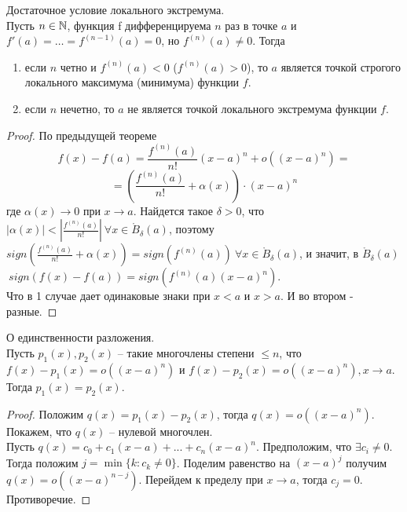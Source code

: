     \begin{corollary}{Достаточное условие локального экстремума.}\\
        Пусть $n \in \mathbb{N}$, функция f дифференцируема $n$ раз в точке $a$ и $f'(a) = \dots = f^{(n-1)}(a) = 0$,
        но $f^{(n)}(a) \neq 0$. Тогда
        \begin{enumerate}
            \item если $n$ четно и $f^{(n)}(a) < 0$ ($f^{(n)}(a) > 0$), то $a$ является точкой
            строгого локального максимума (минимума) функции $f$.
            \item если $n$ нечетно, то $a$ не является точкой локального
            экстремума функции $f$.
        \end{enumerate}
    \end{corollary}
    
    \begin{proof}
        По предыдущей теореме
        \[f(x) - f(a) = \frac{f^{(n)}(a)}{n!}(x-a)^n + o((x-a)^n) =\]
        \[= (\frac{f^{(n)}(a)}{n!} + \alpha(x))\cdot (x-a)^n\]
        где $\alpha(x) \to 0$ при $x \to a$. Найдется такое $\delta > 0$,
        что $|\alpha(x)| < |\frac{f^{(n)}(a)}{n!}| \ \forall x \in \mathring{B}_{\delta}(a)$,
        поэтому $sign(\frac{f^{(n)}(a)}{n!} + \alpha(x)) = sign(f^{(n)}(a)) \ \forall x \in \mathring{B}_{\delta}(a)$,
        и значит, в $\mathring{B}_{\delta}(a)$ $\ sign(f(x) - f(a)) = sign(f^{(n)}(a)(x-a)^n)$.\\
        Что в 1 случае дает одинаковые знаки при $x < a$ и $x > a$. И во втором - разные.
    \end{proof}
    
    \begin{theorem}{О единственности разложения.}\\
        Пусть $p_{1}(x), p_{2}(x)$ -- такие многочлены степени $\leq n$, что $f(x) - p_{1}(x) = o((x-a)^{n})$
        и $f(x) - p_{2}(x) = o((x-a)^{n}), x \to a$. Тогда $p_{1}(x) = p_{2}(x)$.
    \end{theorem}
    
    \begin{proof}
        Положим $q(x) = p_{1}(x) - p_{2}(x)$, тогда $q(x) = o((x-a)^{n})$. Покажем, что $q(x)$ -- нулевой многочлен.\\
        Пусть $q(x) = c_{0} + c_{1}(x-a) + ... + c_{n}(x-a)^{n}$. Предположим, что $\exists c_{i} \neq 0$. Тогда положим $j = \min\{k: c_{k} \neq 0\}$. Поделим равенство на $(x-a)^{j}$ получим $q(x) = o((x-a)^{n-j})$. Перейдем к пределу при $x \to a$, тогда $c_{j} = 0$. Противоречие.
    \end{proof}
    
